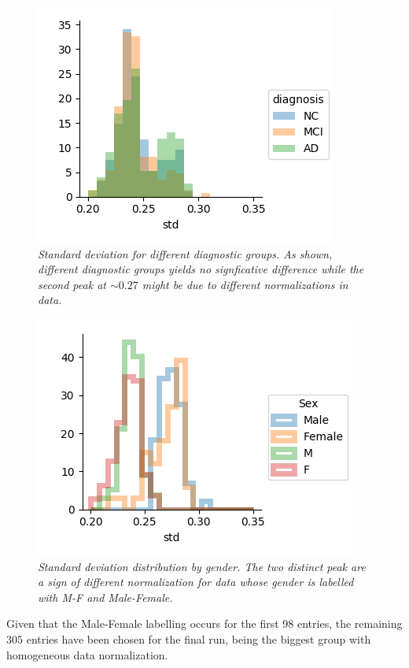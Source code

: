 \documentclass[12pt,openright,twoside,a4paper]{book}
\begin{document}
\begin{figure}[!h]
\centering
\includegraphics[scale=0.75]{std-ADNI}
\caption{\textit{Standard deviation for different diagnostic groups. As shown, different diagnostic groups yields no signficative difference while the second peak at $\sim 0.27$ might be due to different normalizations in data.}}
\label{std-ADNI}
\end{figure}

\begin{figure}[!h]
\centering
\includegraphics[scale=0.75]{ADNi-std-gen}
\caption{\textit{Standard deviation distribution by gender. The two distinct peak are a sign of different normalization for data whose gender is labelled with M-F and Male-Female.}}
\label{std-gen-ADNI}
\end{figure}

Given that the Male-Female labelling occurs for the first 98 entries, the remaining 305 entries have been chosen for the final run, being the biggest group with homogeneous data normalization.
\end{document}
